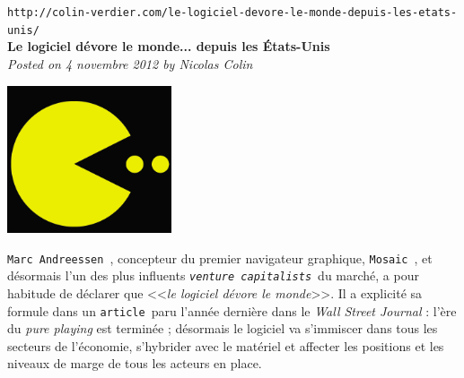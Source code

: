 \documentclass[11pt,twoside,a4paper]{article}
\begin{document}
\setlength\parindent{0pt}

\texttt{\small http://colin-verdier.com/le-logiciel-devore-le-monde-depuis-les-etats-unis/}~\\

\textbf{\Large Le logiciel d{\'e}vore le monde... depuis les {\'E}tats-Unis}~\\
\emph{Posted on 4 novembre 2012 by Nicolas Colin}~\\

\begin{minipage}[h]{5.00cm}
	\includegraphics[width=4.85cm]{img/pacman.png}
\end{minipage} \hfill \begin{minipage}[h]{13cm}
	\texttt{Marc Andreessen}~\footnotemark, concepteur du premier navigateur graphique, \texttt{Mosaic}~\footnotemark, et d{\'e}sormais l'un des plus influents \texttt{\emph{venture capitalists}}~\footnotemark du march{\'e}, a pour habitude de d{\'e}clarer que <<\emph{le logiciel d{\'e}vore le monde}>>. Il a explicit{\'e} sa formule dans un \texttt{article}~\footnotemark paru l'ann{\'e}e derni{\`e}re dans le \emph{Wall Street Journal} : l'{\`e}re du \emph{pure playing} est termin{\'e}e ; d{\'e}sormais le logiciel va s'immiscer dans tous les secteurs de l'{\'e}conomie, s'hybrider avec le mat{\'e}riel et affecter les positions et les niveaux de marge de tous les acteurs en place.
\end{minipage} ~\\~\\
\end{document}
